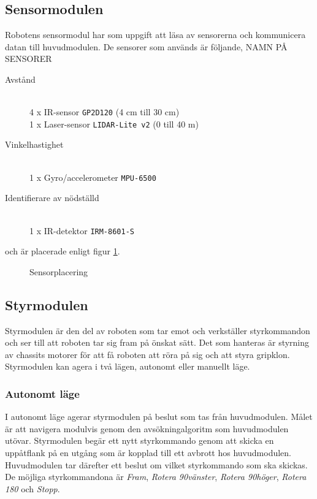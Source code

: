 \documentclass[11pt]{article}
\begin{document}
\begin{flushleft}
\subsection{Sensormodulen}
Robotens sensormodul har som uppgift att läsa av sensorerna och kommunicera datan till huvudmodulen. De sensorer som används är följande, NAMN PÅ SENSORER
\begin{description}
	\item[Avstånd] \hfill \\
	4 x IR-sensor \verb+GP2D120+ (4 cm till 30 cm) \\
	1 x Laser-sensor \verb+LIDAR-Lite v2+ (0 till 40 m) \\
	\item[Vinkelhastighet] \hfill \\
	1 x Gyro/accelerometer \verb+MPU-6500+ 
	\item[Identifierare av nödställd] \hfill \\
	1 x IR-detektor \verb+IRM-8601-S+
\end{description}
och är placerade enligt figur \ref{sensors}. 

\begin{figure}[htbp]
\centering
\noindent\resizebox{.8\textwidth}{!}{
		}
	\caption{Sensorplacering \label{sensors}}
\end{figure}

\subsection{Styrmodulen}
Styrmodulen är den del av roboten som tar emot och verkställer styrkommandon och ser till att roboten tar sig fram på önskat sätt. Det som hanteras är styrning av chassits motorer för att få roboten att röra på sig och att styra gripklon. Styrmodulen kan agera i två lägen, autonomt eller manuellt läge.

\subsubsection*{Autonomt läge}
I autonomt läge agerar styrmodulen på beslut som tas från huvudmodulen. Målet är att navigera modulvis genom den avsökningalgoritm som huvudmodulen utövar. Styrmodulen begär ett nytt styrkommando genom att skicka en uppåtflank på en utgång som är kopplad till ett avbrott hos huvudmodulen. Huvudmodulen tar därefter ett beslut om vilket styrkommando som ska skickas. De möjliga styrkommandona är \textit{Fram}, \textit{Rotera 90\textdegree vänster}, \textit{Rotera 90\textdegree höger}, \textit{Rotera 180\textdegree} och \textit{Stopp}. 


\end{flushleft}
\end{document}
